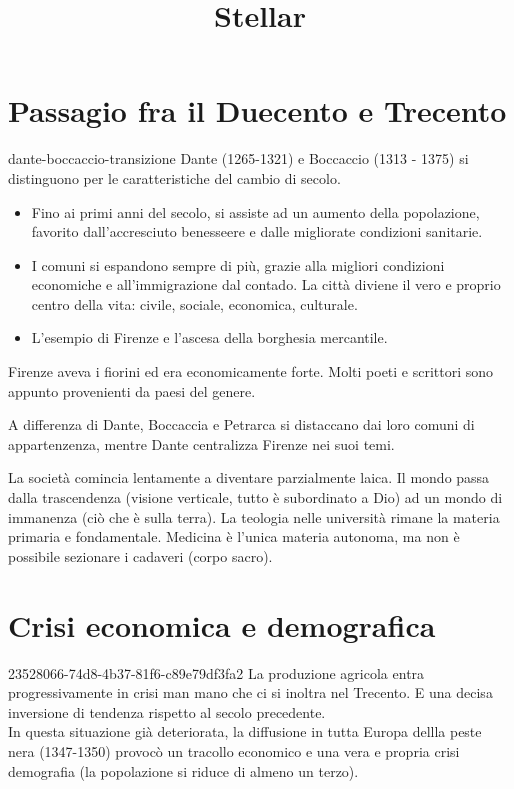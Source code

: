 \documentclass[preview]{standalone}
\begin{document}
\title{Stellar}
\genpage

\section{Passagio fra il Duecento e Trecento}

\begin{snippet}{dante-boccaccio-transizione}
    Dante (1265-1321) e Boccaccio (1313 - 1375)
    si distinguono per le caratteristiche del cambio di secolo.
    
    \begin{itemize}
        \item Fino ai primi anni del secolo, si assiste ad un aumento della popolazione, favorito dall'accresciuto benesseere e dalle migliorate condizioni sanitarie.
        \item I comuni si espandono sempre di più, grazie alla migliori condizioni economiche e all'immigrazione dal contado. La città diviene il vero e proprio centro della vita: civile, sociale, economica, culturale.
        \item L'esempio di Firenze e l'ascesa della borghesia mercantile.
    \end{itemize}
    
    Firenze aveva i fiorini ed era economicamente forte.
    Molti poeti e scrittori sono appunto provenienti da paesi del genere.
    
    A differenza di Dante, Boccaccia e Petrarca si distaccano dai loro comuni di appartenzenza,
    mentre Dante centralizza Firenze nei suoi temi.
    
    La società comincia lentamente a diventare parzialmente laica.
    Il mondo passa dalla trascendenza (visione verticale, tutto è subordinato a Dio)
    ad un mondo di immanenza (ciò che è sulla terra).
    La teologia nelle università rimane la materia primaria e fondamentale. Medicina è l'unica materia autonoma, ma non è possibile sezionare i cadaveri (corpo sacro).
\end{snippet}

\section{Crisi economica e demografica}

\begin{snippet}{23528066-74d8-4b37-81f6-c89e79df3fa2}
    La produzione agricola entra progressivamente in crisi man mano che ci si inoltra nel Trecento.
    E una decisa inversione di tendenza rispetto al secolo precedente.\\
    In questa situazione già deteriorata, la diffusione in tutta Europa dellla peste nera (1347-1350) provocò
    un tracollo economico e una vera e propria crisi demografia (la popolazione si riduce di almeno un terzo).
\end{snippet}

\end{document}
